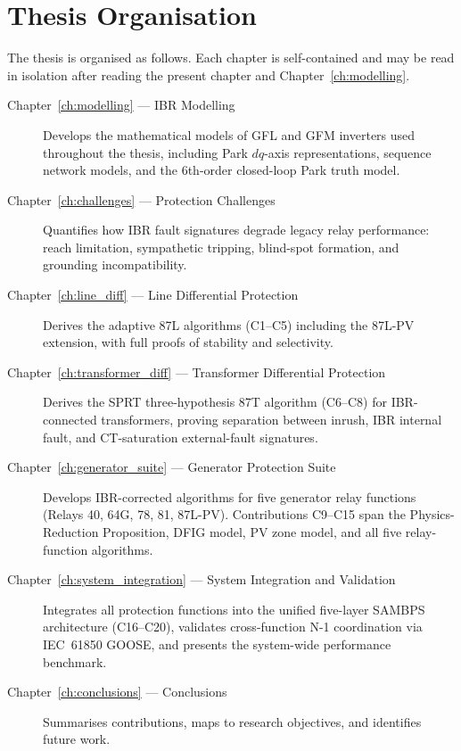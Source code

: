 \section{Thesis Organisation}
\label{sec:ch1_organisation}

The thesis is organised as follows. Each chapter is self-contained and
may be read in isolation after reading the present chapter and Chapter~\ref{ch:modelling}.

\begin{description}
\item[Chapter~\ref{ch:modelling} — IBR Modelling]
  Develops the mathematical models of GFL and GFM inverters used throughout
  the thesis, including Park $dq$-axis representations, sequence network
  models, and the 6th-order closed-loop Park truth model.

\item[Chapter~\ref{ch:challenges} — Protection Challenges]
  Quantifies how IBR fault signatures degrade legacy relay performance:
  reach limitation, sympathetic tripping, blind-spot formation, and
  grounding incompatibility.

\item[Chapter~\ref{ch:line_diff} — Line Differential Protection]
  Derives the adaptive 87L algorithms (C1--C5) including the 87L-PV
  extension, with full proofs of stability and selectivity.

\item[Chapter~\ref{ch:transformer_diff} — Transformer Differential Protection]
  Derives the SPRT three-hypothesis 87T algorithm (C6--C8) for
  IBR-connected transformers, proving separation between inrush, IBR
  internal fault, and CT-saturation external-fault signatures.

\item[Chapter~\ref{ch:generator_suite} — Generator Protection Suite]
  Develops IBR-corrected algorithms for five generator relay functions
  (Relays 40, 64G, 78, 81, 87L-PV). Contributions C9--C15 span the
  Physics-Reduction Proposition, DFIG model, PV zone model, and all five
  relay-function algorithms.

\item[Chapter~\ref{ch:system_integration} — System Integration and Validation]
  Integrates all protection functions into the unified five-layer SAMBPS
  architecture (C16--C20), validates cross-function N-1 coordination via
  IEC~61850 GOOSE, and presents the system-wide performance benchmark.

\item[Chapter~\ref{ch:conclusions} — Conclusions]
  Summarises contributions, maps to research objectives, and identifies
  future work.
\end{description}

